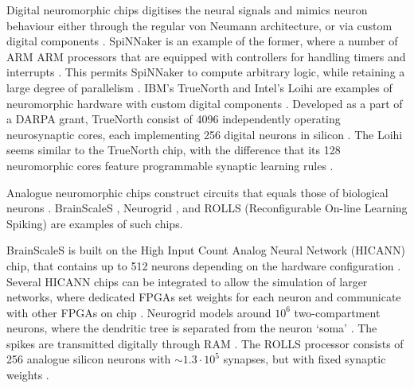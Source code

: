 \documentclass[report.tex]{subfiles}
\begin{document}
Digital neuromorphic chips digitises the neural signals and mimics neuron
behaviour either through the regular \gls{von Neumann} architecture, or
via custom digital components \cite{Walter2015}.
SpiNNaker is an example of the former, where a number of ARM \gls{ARM}
processors that are equipped with controllers for handling timers and
interrupts \cite{Walter2015}.
This permits SpiNNaker to compute arbitrary logic, while retaining
a large degree of parallelism \cite{Albada2018}.
IBM's TrueNorth  and Intel's Loihi 
are examples of neuromorphic hardware with custom digital components 
\cite{Walter2015, Lin2018}.
Developed as a part of a \gls{DARPA} grant, TrueNorth consist of 4096
independently operating neurosynaptic cores, each implementing 256
digital neurons in silicon \cite{Walter2015, ArtificialBrains2018}.
The Loihi seems similar to the TrueNorth chip, with the difference that
its 128 neuromorphic cores feature programmable
synaptic learning rules \cite{Lin2018}.

Analogue neuromorphic chips construct circuits that equals those of biological
neurons \cite{Walter2015}.
BrainScaleS \cite{Schmitt2017}, Neurogrid \cite{BrainsInSilicon2018}, 
and ROLLS (Reconfigurable On-line Learning Spiking)
\cite{Walter2015} are examples of such chips.

BrainScaleS is built on the High Input Count Analog Neural Network (HICANN)
chip, that contains up to 512 neurons depending on the hardware configuration 
\cite{Pfeil2013}.
Several HICANN chips can be integrated to allow the simulation of larger
networks, where dedicated \gls{FPGA}s set weights for each neuron and
communicate with other FPGAs on chip \cite{Walter2015}. 
Neurogrid models around $10^6$ two-compartment neurons, where the dendritic
tree is separated from the neuron `soma' \cite{Walter2015}.
The spikes are transmitted digitally through \gls{RAM} \cite{Walter2015}.
The ROLLS processor consists of 256 analogue silicon neurons with
$\sim1.3 \cdot 10^5$ synapses, but with fixed synaptic weights
\cite{Walter2015}.

%
%
\end{document}
